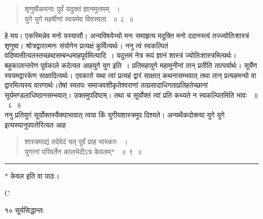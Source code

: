 \documentclass[11pt, openany]{book}
\begin{document}
\begin{quote}
  {\ssi शृणुष्वैकमनाः पूर्वं यदुक्तं ज्ञानमुत्तमम् ~।\\
युगे युगे महर्षीणां स्वयमेव विवस्वता ~॥~८~॥}
\end{quote}
 हे मय। एकस्मिन्नेव मनो यस्यासौ। अन्यविषयेभ्यो मनः समाहृत्य मदुक्ति मनो ददानस्त्वं तज्ज्योतिःशास्त्रं शृणुष्व। श्रोत्रद्वारात्मनः संयोगेन प्रत्यक्षं कुर्वित्यर्थः। ननु त्वं स्वकल्पितं वदिष्यसीत्यतस्तच्छब्दसम्बन्धमाह\textendash पूर्वमित्यादि~। यदुत्तमं नेत्र रूपं ज्ञानं शास्त्रं ज्योतिःशास्त्रमित्यर्थः। बहुकालान्तरेण पूर्वकाले कदेत्यत आह\textendash युगे युग इति~। प्रतिमहायुगे महामुनीनां तान् प्रतीति तात्पर्यार्थः। सूर्येण स्वयमद्वारकेण साक्षादित्यर्थः। एवकारो यथा त्वां प्रत्यहं द्वारं साक्षात् कथनासम्भवात् तथा तान् प्रत्यहमन्यो वा द्वारमित्यस्य वारणार्थः।तेषां स्वतपः समाजवशीकृतेश्वराणां तत्प्रसादाधिगताप्रतिहतेच्छानां सूर्यमण्डलाधिष्ठानसम्भवात्। उक्तमुपदिष्टम्। तथा च सूर्योक्तं त्वां प्रति कथ्यते न स्वकल्पितमिति भावः ~॥~८~॥\\
 \noindent ननु प्रतियुगं सूर्योक्तस्यैक्याभावात् त्वया किं युगीयशास्त्रमुप
दिश्यते। अन्यथैकदोक्त्या युगे युगे इत्यस्यानुपपत्तेरित्यत आह\textendash


\begin{quote}
{\ssi शास्त्रमाद्यं तदेवेदं यत् पूर्वं प्राह भास्करः ~।\\
युगानां परिवर्तेन कालभेदीऽत्र केवलम्* ~॥~९~॥ }
\end{quote}
\rule{\linewidth}{.5pt}

\begin{center}
 * केवल इति वा पाठः।
 \end{center}

{\tiny{C}}

\newpage


\noindent १० \hspace{4cm} सूर्यसिद्धान्तः
\vspace{1cm}
\end{document}
